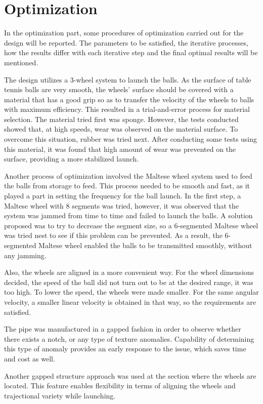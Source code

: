 \documentclass[12pt]{article}
\begin{document}
\section{Optimization}
In the optimization part, some procedures of optimization carried out for the design will be reported. The parameters to be satisfied, the iterative processes, how the results differ with each iterative step and the final optimal results will be mentioned.

The design utilizes a 3-wheel system to launch the balls. As the surface of table tennis balls are very smooth, the wheels’ surface should be covered with a material that has a good grip so as to transfer the velocity of the wheels to balls with maximum efficiency. This resulted in a trial-and-error process for material selection. The material tried first was sponge. However, the tests conducted showed that, at high speeds, wear was observed on the material surface. To overcome this situation, rubber was tried next. After conducting some tests using this material, it was found that high amount of wear was prevented on the surface, providing a more stabilized launch. 

Another process of optimization involved the Maltese wheel system used to feed the balls from storage to feed. This process needed to be smooth and fast, as it played a part in setting the frequency for the ball launch. In the first step, a Maltese wheel with 8 segments was tried, however, it was observed that the system was jammed from time to time and failed to launch the balls. A solution proposed was to try to decrease the segment size, so a 6-segmented Maltese wheel was tried nest to see if this problem can be prevented. As a result, the 6-segmented Maltese wheel enabled the balls to be transmitted smoothly, without any jamming. 

Also, the wheels are aligned in a more convenient way. For the wheel dimensions decided, the speed of the ball did not turn out to be at the desired range, it was too high. To lower the speed, the wheels were made smaller. For the same angular velocity, a smaller linear velocity is obtained in that way, so the requirements are satisfied.

The pipe was manufactured in a gapped fashion in order to observe whether there exists a notch, or any type of texture anomalies. Capability of determining this type of anomaly provides an early response to the issue, which saves time and cost as well. 

Another gapped structure approach was used at the section where the wheels are located. This feature enables flexibility in terms of aligning the wheels and trajectional variety while launching.  
\end{document}
